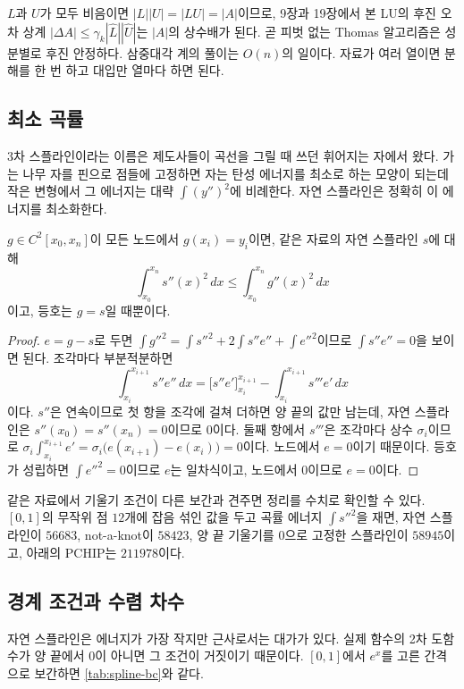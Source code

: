 $L$과 $U$가 모두 비음이면 $|L||U|=|LU|=|A|$이므로, 9장과 19장에서 본 LU의 후진 오차 상계 $|\Delta A|\le\gamma_k|\hat L||\hat U|$는 $|A|$의 상수배가 된다. 곧 피벗 없는 Thomas 알고리즘은 성분별로 후진 안정하다. 삼중대각 계의 풀이는 $O(n)$의 일이다. 자료가 여러 열이면 분해를 한 번 하고 대입만 열마다 하면 된다.

\subsection{최소 곡률}

3차 스플라인이라는 이름은 제도사들이 곡선을 그릴 때 쓰던 휘어지는 자에서 왔다. 가는 나무 자를 핀으로 점들에 고정하면 자는 탄성 에너지를 최소로 하는 모양이 되는데 작은 변형에서 그 에너지는 대략 $\int(y'')^2$에 비례한다. 자연 스플라인은 정확히 이 에너지를 최소화한다\cite{holladay1957}.

\begin{theorem}[Holladay]
\label{thm:holladay}
$g\in C^2[x_0,x_n]$이 모든 노드에서 $g(x_i)=y_i$이면, 같은 자료의 자연 스플라인 $s$에 대해
\[
\int_{x_0}^{x_n}s''(x)^2\,dx\le\int_{x_0}^{x_n}g''(x)^2\,dx
\]
이고, 등호는 $g=s$일 때뿐이다.
\end{theorem}

\begin{proof}
$e=g-s$로 두면 $\int g''^2=\int s''^2+2\int s''e''+\int e''^2$이므로 $\int s''e''=0$을 보이면 된다. 조각마다 부분적분하면
\[
\int_{x_i}^{x_{i+1}}s''e''\,dx=\bigl[s''e'\bigr]_{x_i}^{x_{i+1}}-\int_{x_i}^{x_{i+1}}s'''e'\,dx
\]
이다. $s''$은 연속이므로 첫 항을 조각에 걸쳐 더하면 양 끝의 값만 남는데, 자연 스플라인은 $s''(x_0)=s''(x_n)=0$이므로 $0$이다. 둘째 항에서 $s'''$은 조각마다 상수 $\sigma_i$이므로 $\sigma_i\int_{x_i}^{x_{i+1}}e'=\sigma_i\bigl(e(x_{i+1})-e(x_i)\bigr)=0$이다. 노드에서 $e=0$이기 때문이다. 등호가 성립하면 $\int e''^2=0$이므로 $e$는 일차식이고, 노드에서 $0$이므로 $e=0$이다.
\end{proof}

같은 자료에서 기울기 조건이 다른 보간과 견주면 정리를 수치로 확인할 수 있다. $[0,1]$의 무작위 점 $12$개에 잡음 섞인 값을 두고 곡률 에너지 $\int s''^2$을 재면, 자연 스플라인이 $56683$, not-a-knot이 $58423$, 양 끝 기울기를 $0$으로 고정한 스플라인이 $58945$이고, 아래의 PCHIP는 $211978$이다.

\subsection{경계 조건과 수렴 차수}

자연 스플라인은 에너지가 가장 작지만 근사로서는 대가가 있다. 실제 함수의 2차 도함수가 양 끝에서 $0$이 아니면 그 조건이 거짓이기 때문이다. $[0,1]$에서 $e^x$를 고른 간격으로 보간하면 \cref{tab:spline-bc}와 같다.

